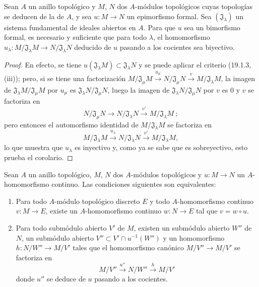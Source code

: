 \begin{corollary}[19.1.4]
\label{0.19.1.4-fr}
Sean $A$ un anillo topológico y $M$, $N$ dos $A$-módulos topológicos cuyas
topologías se deducen de la de $A$, y sea $u:M\to N$ un epimorfismo
formal. Sea $(\mathfrak J_\lambda)$ un sistema fundamental de ideales abiertos
en $A$. Para que $u$ sea un bimorfismo formal, es necesario y suficiente que para
todo $\lambda$, el homomorfismo
$u_\lambda:M/\mathfrak J_\lambda M\to N/\mathfrak J_\lambda N$ deducido de $u$
pasando a los cocientes sea biyectivo.
\end{corollary}

\begin{proof}
En efecto, se tiene $u(\mathfrak J_\lambda M)\subset\mathfrak J_\lambda N$ y se
puede aplicar el criterio (19.1.3, (iii)); pero, si se tiene una factorización
$M/\mathfrak J_\mu M\xrightarrow{u_\mu}N/\mathfrak J_\mu N\xrightarrow{v}M/\mathfrak J_\lambda M$,
la imagen de $\mathfrak J_\lambda M/\mathfrak J_\mu M$ por $u_\mu$ es
$\mathfrak J_\lambda N/\mathfrak J_\mu N$, luego la imagen de
$\mathfrak J_\lambda N/\mathfrak J_\mu N$ por $v$ es 0 y $v$ se factoriza en
\[
  N/\mathfrak J_\mu N\longrightarrow N/\mathfrak J_\lambda N
  \xrightarrow{v'}M/\mathfrak J_\lambda M~;
\]
pero entonces el automorfismo identidad de $M/\mathfrak J_\lambda M$ se factoriza
en
\[
  M/\mathfrak J_\lambda M\xrightarrow{u_\lambda}
  N/\mathfrak J_\lambda N\xrightarrow{v'}M/\mathfrak J_\lambda M,
\]
lo que muestra que $u_\lambda$ es inyectivo y, como ya se sabe que es
sobreyectivo, esto prueba el corolario.
\end{proof}

\begin{proposition}[19.1.5]
\label{0.19.1.5-fr}
Sean $A$ un anillo topológico, $M$, $N$ dos $A$-módulos topológicos y
$u:M\to N$ un $A$-homomorfismo continuo. Las condiciones siguientes son
equivalentes:
\begin{enumerate}
  \item[\textup{a)}] Para todo $A$-módulo topológico \textup{discreto} $E$ y todo
  $A$-homomorfismo continuo $v:M\to E$, existe un $A$-homomorfismo continuo
  $w:N\to E$ tal que $v=w\circ u$.
  \item[\textup{b)}] Para todo submódulo abierto $V'$ de $M$, existen un submódulo
  abierto $W''$ de $N$, un submódulo abierto
  $V''\subset V'\cap u^{-1}(W'')$ y un homomorfismo
  $h:N/W''\to M/V'$ tales que el homomorfismo canónico
  $M/V''\to M/V'$ se factoriza en
  \[
    M/V''\xrightarrow{u''}N/W''\xrightarrow{h}M/V'
  \]
  donde $u''$ se deduce de $u$ pasando a los cocientes.
\end{enumerate}
\end{proposition}

